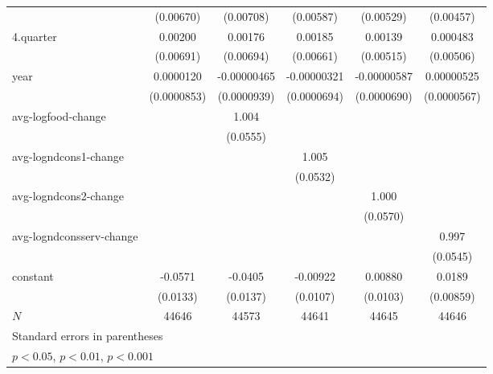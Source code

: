 \begin{table}[htbp]
\begin{tabular}{l*{5}{c}}
            &   (0.00670)         &   (0.00708)         &   (0.00587)         &   (0.00529)         &   (0.00457)         \\
4.quarter   &     0.00200         &     0.00176         &     0.00185         &     0.00139         &    0.000483         \\
            &   (0.00691)         &   (0.00694)         &   (0.00661)         &   (0.00515)         &   (0.00506)         \\
year        &   0.0000120         & -0.00000465         & -0.00000321         & -0.00000587         &  0.00000525         \\
            & (0.0000853)         & (0.0000939)         & (0.0000694)         & (0.0000690)         & (0.0000567)         \\
avg-logfood-change&                     &       1.004\sym{***}&                     &                     &                     \\
            &                     &    (0.0555)         &                     &                     &                     \\
avg-logndcons1-change&                     &                     &       1.005\sym{***}&                     &                     \\
            &                     &                     &    (0.0532)         &                     &                     \\
avg-logndcons2-change&                     &                     &                     &       1.000\sym{***}&                     \\
            &                     &                     &                     &    (0.0570)         &                     \\
avg-logndconsserv-change&                     &                     &                     &                     &       0.997\sym{***}\\
            &                     &                     &                     &                     &    (0.0545)         \\
constant    &     -0.0571\sym{***}&     -0.0405\sym{**} &    -0.00922         &     0.00880         &      0.0189\sym{*}  \\
            &    (0.0133)         &    (0.0137)         &    (0.0107)         &    (0.0103)         &   (0.00859)         \\
\hline
\(N\)       &       44646         &       44573         &       44641         &       44645         &       44646         \\
\hline\hline
\multicolumn{6}{l}{\footnotesize Standard errors in parentheses}\\
\multicolumn{6}{l}{\footnotesize \sym{*} \(p<0.05\), \sym{**} \(p<0.01\), \sym{***} \(p<0.001\)}\\
\end{tabular}
\end{table}
